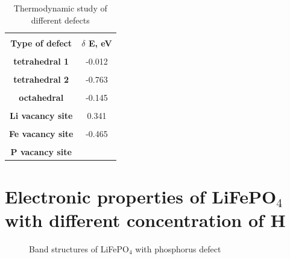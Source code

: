 \begin{table}[h]
\scriptsize{
\caption{Thermodynamic study of different defects}
\label{thermodyn}
\begin{center}
\begin{tabular}{|c|c|}
\hline
& \\
 \textbf{Type of defect} & \textbf{ $\delta$ E, eV} \\ 
\hline
& \\
\textbf{tetrahedral 1}  &  -0.012 \\ 
\hline
& \\
\textbf{tetrahedral 2} &  -0.763 \\
\hline
& \\
\textbf{octahedral} & -0.145 \\
\hline
& \\
\textbf{Li vacancy site} & 0.341 \\
\hline
& \\
\textbf{Fe vacancy site} & -0.465 \\
\hline
& \\
\textbf{P vacancy site} &  \\
\hline
\end{tabular}
\end{center}
}
\end{table}

\section{Electronic properties of LiFePO$_4$ with different concentration of H}

\begin{figure}[h]
\begin{minipage}[h]{1.0\linewidth}
\caption{Band structures of LiFePO$_4$ with phosphorus defect}
\label{LFP_Pvac_bs}
\end{minipage}
\end{figure}

